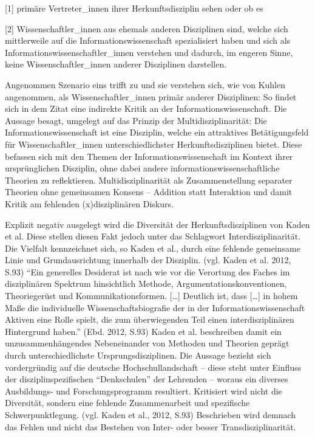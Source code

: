 \documentclass[a4paper,
fontsize=11pt,
oneside,
numbers=noperiodatend,
parskip=half-,
bibliography=totoc,
final
]{scrartcl}
\begin{document}
{[}1{]} primäre Vertreter\_innen ihrer Herkunftsdisziplin sehen oder ob
es

{[}2{]} Wissenschaftler\_innen aus ehemals anderen Disziplinen sind,
welche sich mittlerweile auf die Informationswissenschaft spezialisiert
haben und sich als Informationswissenschaftler\_innen verstehen und
dadurch, im engeren Sinne, keine Wissenschaftler\_innen anderer
Disziplinen darstellen.

Angenommen Szenario eins trifft zu und sie verstehen sich, wie von
Kuhlen angenommen, als Wissenschaftler\_innen primär anderer
Disziplinen: So findet sich in dem Zitat eine indirekte Kritik an der
Informationswissenschaft. Die Aussage besagt, umgelegt auf das Prinzip
der Multidisziplinarität: Die Informationswissenschaft ist eine
Disziplin, welche ein attraktives Betätigungsfeld für
Wissenschaftler\_innen unterschiedlichster Herkunftsdisziplinen bietet.
Diese befassen sich mit den Themen der Informationswissenschaft im
Kontext ihrer ursprünglichen Disziplin, ohne dabei andere
informationswissenschaftliche Theorien zu reflektieren.
Multidisziplinarität als Zusammenstellung separater Theorien ohne
gemeinsamen Konsens -- Addition statt Interaktion und damit Kritik am
fehlenden (x)disziplinären Diskurs.

Explizit negativ ausgelegt wird die Diversität der Herkunftsdisziplinen
von Kaden et al. Diese stellen diesen Fakt jedoch unter das Schlagwort
Interdisziplinarität. Die Vielfalt kennzeichnet sich, so Kaden et al.,
durch eine fehlende gemeinsame Linie und Grundausrichtung innerhalb der
Disziplin. (vgl. Kaden et al. 2012, S.93) \enquote{Ein generelles
Desiderat ist nach wie vor die Verortung des Faches im disziplinären
Spektrum hinsichtlich Methode, Argumentationskonventionen, Theoriegerüst
und Kommunikationsformen. {[}\ldots{}{]} Deutlich ist, dass
{[}\ldots{}{]} in hohem Maße die individuelle Wissenschaftsbiografie der
in der Informationswissenschaft Aktiven eine Rolle spielt, die zum
überwiegenden Teil einen interdisziplinären Hintergrund haben.} (Ebd.
2012, S.93) Kaden et al. beschreiben damit ein unzusammenhängendes
Nebeneinander von Methoden und Theorien geprägt durch unterschiedlichste
Ursprungsdisziplinen. Die Aussage bezieht sich vordergründig auf die
deutsche Hochschullandschaft -- diese steht unter Einfluss der
disziplinspezifischen \enquote{Denkschulen} der Lehrenden -- woraus ein
diverses Ausbildungs- und Forschungsprogramm resultiert. Kritisiert wird
nicht die Diversität, sondern eine fehlende Zusammenarbeit und
spezifische Schwerpunktlegung. (vgl. Kaden et al., 2012, S.93)
Beschrieben wird demnach das Fehlen und nicht das Bestehen von Inter-
oder besser Transdisziplinarität.
\end{document}

